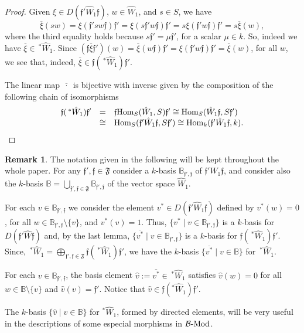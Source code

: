 \documentclass{article}
\theoremstyle{definition}
\newtheorem{remark}[theorem]{Remark}
\newcommand{\Hom}{{ \rm Hom }}
\newcommand{\Mod}{{ \rm Mod }}
\renewcommand{\frak}{\mathfrak}
\newcommand{\g}{\hbox{-}}
\newcommand{\hueca}[1]{\mathbb{#1}}
\begin{document}
\begin{proof} Given $\xi\in D(\frak{f}'\hat{W}_1\frak{f})$, $w\in \hat{W}_1$, and $s\in S$, we have 
$$\overline{\xi}(sw)=\xi(\frak{f}'sw\frak{f})\frak{f}'=\xi(s\frak{f}'w\frak{f})\frak{f}'=
s\xi(\frak{f}'w\frak{f})\frak{f}'=s\overline{\xi}(w), $$
where the third equality holds because $s\frak{f}'=\mu \frak{f}'$, for a scalar $\mu\in k$. So, indeed we have $\overline{\xi}\in \,^*\hat{W}_1$.  Since $(\frak{f}\overline{\xi}\frak{f}')(w)=\overline{\xi}(w\frak{f})\frak{f}'=\xi(\frak{f}'w\frak{f})\frak{f}'=\overline{\xi}(w)$, for all $w$, we see that, indeed,  $\overline{\xi}\in \frak{f}(\,^*\hat{W}_1)\frak{f}'$.

The linear map $\overline{ \,\cdot\,  }$ is bijective with inverse given by the composition of 
 the following chain of isomorphisms
$$\begin{matrix}\frak{f}(\,^*\hat{W}_1)\frak{f}'&=&\frak{f}\Hom_S(\hat{W}_1,S)\frak{f}'
\cong \Hom_S(\hat{W}_1\frak{f},S\frak{f}')\hfill\\ 
&\cong& \Hom_S(\frak{f}'\hat{W}_1\frak{f},S\frak{f}')\cong \Hom_k(\frak{f}'\hat{W}_1\frak{f},k).\\\end{matrix}$$
\end{proof}


\begin{remark}\label{R: base de hatW para descripcion de morfismos en B-mod} The notation given in the following will be kept throughout the whole paper. 
For any  $\frak{f}',\frak{f}\in \frak{F}$ consider a $k$-basis 
$\hueca{B}_{\frak{f}',\frak{f}}$ of   $\frak{f}'\hat{W}_1 \frak{f}$, and consider also the $k$-basis 
$\hueca{B} = \bigcup_{\frak{f}',\frak{f}\in \frak{F}} \hueca{B}_{\frak{f}',\frak{f}}$ of the vector space $\hat{W}_1$. 

For each $v\in \hueca{B}_{\frak{f}',\frak{f}}$ we consider the element $v^*\in D(\frak{f}'\hat{W}_1\frak{f})$ defined by $v^*(w)=0$, for all $w\in \hueca{B}_{\frak{f}',\frak{f}}\setminus\{v\}$, and $v^*(v)=1$. Thus, $\{v^*\mid v\in \hueca{B}_{\frak{f}',\frak{f}}\}$ is a $k$-basis for $D(\frak{f}'\hat{W}\frak{f})$ and, by the last lemma, $\{\overline{v^*}\mid v\in \hueca{B}_{\frak{f}',\frak{f}}\}$ is a $k$-basis for $\frak{f}(\,^*\hat{W}_1)\frak{f}'$.  Since, 
$\,^*\hat{W}_1=\bigoplus_{\frak{f}',\frak{f}\in \frak{F}}\frak{f}(\,^*\hat{W}_1)\frak{f}'$, we have the $k$-basis $\{\overline{v^*}\mid v\in \hueca{B}\}$ for $\,^*\hat{W}_1$.   

For each $v\in \hueca{B}_{\frak{f}',\frak{f}}$, the basis  element 
$\hat{v}:=\overline{v^*}\in  \,^*\hat{W}_1$  satisfies  
$\hat{v}(w)=0$ for all $w\in \hueca{B}\setminus{\{v\}} $ and $\hat{v}(v)=\frak{f}'$. Notice that $\hat{v}\in \frak{f}(^*\hat{W}_1)\frak{f}'$. 

 The $k$-basis $\{\hat{v}\mid v\in \hueca{B}\}$ 
 for $^*\hat{W}_1$, formed by directed elements, will be very useful in the descriptions of some  especial morphisms in ${\cal B}\g\Mod$. 
\end{remark}
\end{document}
